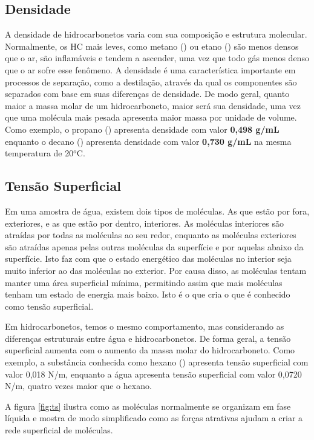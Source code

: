\documentclass[a4paper,12pt]{book}
\begin{document}
\subsection{Densidade}
A densidade de hidrocarbonetos varia com sua composição e estrutura molecular. Normalmente, os HC mais leves, como metano () ou etano () são menos densos que o ar, são inflamáveis e tendem a ascender, uma vez que todo gás menos denso que o ar sofre esse fenômeno. A densidade é uma característica  importante em processos de separação, como a destilação, através da qual os componentes são separados com base em suas diferenças de densidade. De modo geral, quanto maior a massa molar de um hidrocarboneto, maior será sua densidade, uma vez que uma molécula mais pesada apresenta maior massa por unidade de volume. Como exemplo, o propano () apresenta densidade com valor \textbf{0,498 g/mL} enquanto o decano () apresenta densidade com valor \textbf{0,730 g/mL} na mesma temperatura de 20{$^o$}C.

\subsection{Tensão Superficial}
Em uma amostra de água, existem dois tipos de moléculas. As que estão por fora, exteriores, e as que estão por dentro, interiores. As moléculas interiores são atraídas por todas as moléculas ao seu redor, enquanto as moléculas exteriores são atraídas apenas pelas outras moléculas da superfície e por aquelas abaixo da superfície. Isto faz com que o estado energético das moléculas no interior seja muito inferior ao das moléculas no exterior. Por causa disso, as moléculas tentam manter uma área superficial mínima, permitindo assim que mais moléculas tenham um estado de energia mais baixo. Isto é o que cria o que é conhecido como tensão superficial.

Em hidrocarbonetos, temos o mesmo comportamento, mas considerando as diferenças estruturais entre água e hidrocarbonetos. De forma geral, a tensão superficial aumenta com o aumento da massa molar do hidrocarboneto. Como exemplo, a substância conhecida como hexano () apresenta tensão superficial com valor 0,018 N/m, enquanto a água apresenta tensão superficial com valor 0,0720 N/m, quatro vezes maior que o hexano.

A figura \ref{fig:ts} ilustra como as moléculas normalmente se organizam em fase líquida e mostra de modo simplificado como as forças atrativas ajudam a criar a rede superficial de moléculas.
\end{document}
